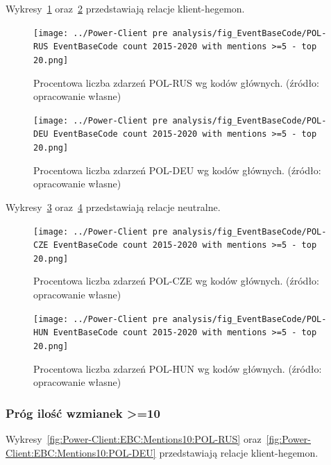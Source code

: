 \documentclass[11pt]{report}
\begin{document}
    Wykresy~\ref{fig:Power-Client:EBC:Mentions:POL-RUS} oraz~\ref{fig:Power-Client:EBC:Mentions:POL-DEU} przedstawiają relacje klient-hegemon.

    \begin{figure}[tp]
        \centering
        \texttt{[image: ../Power-Client pre analysis/fig\_EventBaseCode/POL-RUS EventBaseCode count 2015-2020 with mentions >=5 - top 20.png]}
        \caption{Procentowa liczba zdarzeń POL-RUS wg kodów głównych. (źródło: opracowanie własne)}
        \label{fig:Power-Client:EBC:Mentions:POL-RUS}
    \end{figure}

    \begin{figure}[tp]
        \centering
        \texttt{[image: ../Power-Client pre analysis/fig\_EventBaseCode/POL-DEU EventBaseCode count 2015-2020 with mentions >=5 - top 20.png]}
        \caption{Procentowa liczba zdarzeń POL-DEU wg kodów głównych. (źródło: opracowanie własne)}
        \label{fig:Power-Client:EBC:Mentions:POL-DEU}
    \end{figure}

    Wykresy~\ref{fig:Power-Client:EBC:Mentions:POL-CZE} oraz~\ref{fig:Power-Client:EBC:Mentions:POL-HUN} przedstawiają relacje neutralne.

    \begin{figure}[tp]
        \centering
        \texttt{[image: ../Power-Client pre analysis/fig\_EventBaseCode/POL-CZE EventBaseCode count 2015-2020 with mentions >=5 - top 20.png]}
        \caption{Procentowa liczba zdarzeń POL-CZE wg kodów głównych. (źródło: opracowanie własne)}
        \label{fig:Power-Client:EBC:Mentions:POL-CZE}
    \end{figure}

    \begin{figure}[tp]
        \centering
        \texttt{[image: ../Power-Client pre analysis/fig\_EventBaseCode/POL-HUN EventBaseCode count 2015-2020 with mentions >=5 - top 20.png]}
        \caption{Procentowa liczba zdarzeń POL-HUN wg kodów głównych. (źródło: opracowanie własne)}
        \label{fig:Power-Client:EBC:Mentions:POL-HUN}
    \end{figure}

    \subsubsection{Próg ilość wzmianek >=10}\label{subsubsec:ebc:próg-ilość-wzmianek->=10}

    Wykresy~\ref{fig:Power-Client:EBC:Mentions10:POL-RUS} oraz~\ref{fig:Power-Client:EBC:Mentions10:POL-DEU} przedstawiają relacje klient-hegemon.
\end{document}
